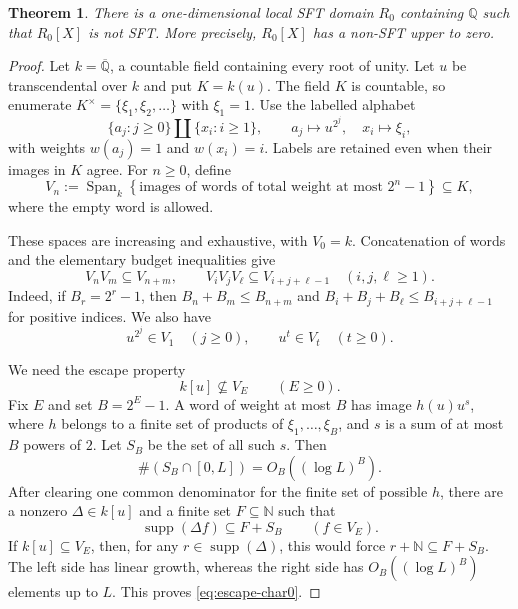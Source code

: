 \documentclass[11pt,reqno]{amsart}
\numberwithin{equation}{section}
\theoremstyle{plain}
\newtheorem{theorem}{Theorem}[section]
\theoremstyle{definition}
\theoremstyle{remark}
\newcommand{\Span}{\operatorname{Span}}
\begin{document}
\begin{theorem}\label{thm:equicharacteristic-zero}
There is a one-dimensional local SFT domain $R_0$ containing $\mathbb Q$
such that $R_0[X]$ is not SFT.  More precisely, $R_0[X]$ has a non-SFT
upper to zero.
\end{theorem}

\begin{proof}
Let $k=\overline{\mathbb Q}$, a countable field containing every root of
unity.  Let $u$ be transcendental over $k$ and put $K=k(u)$.  The field $K$
is countable, so enumerate
$K^\times=\{\xi_1,\xi_2,\ldots\}$ with $\xi_1=1$.
Use the labelled alphabet
\[
  \{a_j:j\geq0\}\amalg\{x_i:i\geq1\},
  \qquad a_j\mapsto u^{2^j},\quad x_i\mapsto\xi_i,
\]
with weights $w(a_j)=1$ and $w(x_i)=i$.  Labels are retained even when
their images in $K$ agree.  For $n\geq0$, define
\begin{equation}\label{eq:V-char0}
 V_n:=\Span_k\left\{
  \text{images of words of total weight at most }2^n-1
 \right\}\subseteq K,
\end{equation}
where the empty word is allowed.

These spaces are increasing and exhaustive, with $V_0=k$.  Concatenation
of words and the elementary budget inequalities give
\begin{equation}\label{eq:filtration-char0}
 V_nV_m\subseteq V_{n+m},\qquad
 V_iV_jV_\ell\subseteq V_{i+j+\ell-1}\quad(i,j,\ell\geq1).
\end{equation}
Indeed, if $B_r=2^r-1$, then
$B_n+B_m\leq B_{n+m}$ and
$B_i+B_j+B_\ell\leq B_{i+j+\ell-1}$ for positive indices.  We also have
\begin{equation}\label{eq:powers-char0}
 u^{2^j}\in V_1\quad(j\geq0),\qquad u^t\in V_t\quad(t\geq0).
\end{equation}

We need the escape property
\begin{equation}\label{eq:escape-char0}
  k[u]\nsubseteq V_E\qquad(E\geq0).
\end{equation}
Fix $E$ and set $B=2^E-1$.  A word of weight at most $B$ has image
$h(u)u^s$, where $h$ belongs to a finite set of products of
$\xi_1,\ldots,\xi_B$, and $s$ is a sum of at most $B$ powers of $2$.
Let $S_B$ be the set of all such $s$.  Then
\[
  \#(S_B\cap[0,L])=O_B((\log L)^B).
\]
After clearing one common denominator for the finite set of possible $h$,
there are a nonzero $\Delta\in k[u]$ and a finite set $F\subseteq\mathbb N$
such that
\[
  \operatorname{supp}(\Delta f)\subseteq F+S_B\qquad(f\in V_E).
\]
If $k[u]\subseteq V_E$, then, for any
$r\in\operatorname{supp}(\Delta)$, this would force
$r+\mathbb N\subseteq F+S_B$.  The left side has linear growth, whereas
the right side has $O_B((\log L)^B)$ elements up to $L$.  This proves
\eqref{eq:escape-char0}.


\end{proof}
\end{document}
